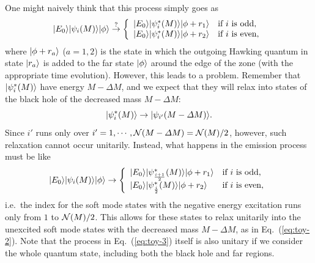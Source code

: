\documentclass[12pt]{article}
\begin{document}
One might naively think that this process simply goes as
%
\begin{equation}
  \ket{E_0} \ket{\psi_i(M)} \ket{\phi} 
  \stackrel{?}{\rightarrow} \left\{ \begin{array}{ll}
    \ket{E_0} \ket{\psi^*_i(M)} \ket{\phi + r_1} & 
      \mbox{if $i$ is odd}, \\
    \ket{E_0} \ket{\psi^*_i(M)} \ket{\phi + r_2} &
      \mbox{if $i$ is even},
  \end{array} \right.
\label{eq:toy-1}
\end{equation}
%
where $| \phi + r_a \rangle$ ($a=1,2$) is the state in which the outgoing 
Hawking quantum in state $| r_a \rangle$ is added to the far state 
$| \phi \rangle$ around the edge of the zone (with the appropriate 
time evolution).  However, this leads to a problem.  Remember that 
$| \psi^*_i(M) \rangle$ have energy $M - \varDelta M$, and we expect 
that they will relax into states of the black hole of the decreased 
mass $M - \varDelta M$:
%
\begin{equation}
  \ket{\psi^*_i(M)} \rightarrow \ket{\psi_{i'}(M-\varDelta M)}.
\label{eq:toy-2}
\end{equation}
%
Since $i'$ runs only over $i' = 1,\cdots,{\cal N}(M-\varDelta M) 
= {\cal N}(M)/2$, however, such relaxation cannot occur unitarily. 
Instead, what happens in the emission process must be like
%
\begin{equation}
  \ket{E_0} \ket{\psi_i(M)} \ket{\phi} 
  \rightarrow \left\{ \begin{array}{ll}
    \ket{E_0} \ket{\psi^*_{\frac{i+1}{2}}(M)} \ket{\phi + r_1} & 
      \mbox{if $i$ is odd}, \\
    \ket{E_0} \ket{\psi^*_{\frac{i}{2}}(M)} \ket{\phi + r_2} &
      \mbox{if $i$ is even},
  \end{array} \right.
\label{eq:toy-3}
\end{equation}
%
i.e.\ the index for the soft mode states with the negative energy 
excitation runs only from $1$ to ${\cal N}(M)/2$.  This allows 
for these states to relax unitarily into the unexcited soft 
mode states with the decreased mass $M - \varDelta M$, as in 
Eq.~(\ref{eq:toy-2}).  Note that the process in Eq.~(\ref{eq:toy-3}) 
itself is also unitary if we consider the whole quantum state, 
including both the black hole and far regions.
\end{document}
